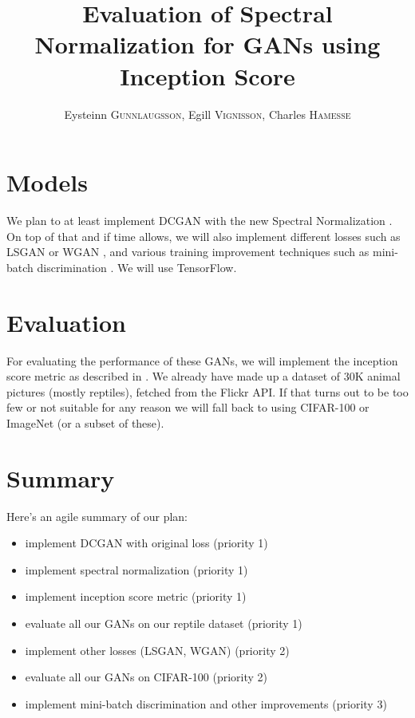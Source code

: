 \documentclass[a4paper]{article}
\title{Evaluation of Spectral Normalization for GANs using Inception Score}
\author{
	Eysteinn \textsc{Gunnlaugsson},
	Egill \textsc{Vignisson},
	Charles \textsc{Hamesse}
}
\begin{document}
\maketitle

 
 
\section{Models} 
We plan to at least implement DCGAN \cite{DBLP:journals/corr/RadfordMC15} with the new Spectral Normalization \cite{miyato2018spectral}. On top of that and if time allows, we will also implement different losses such as LSGAN \cite{mao2017least} or WGAN \cite{arjovsky2017wasserstein}, and various training improvement techniques such as mini-batch discrimination \cite{salimans2016improved}. We will use TensorFlow.

\section{Evaluation} 
For evaluating the performance of these GANs, we will implement the inception score metric as described in \cite{salimans2016improved}. We already have made up a dataset of 30K animal pictures (mostly reptiles), fetched from the Flickr API. If that turns out to be too few or not suitable for any reason we will fall back to using CIFAR-100 or ImageNet (or a subset of these).  

\section{Summary}
Here's an agile summary of our plan: 
\begin{itemize}
	\item implement DCGAN with original loss (priority 1)
	\item implement spectral normalization (priority 1)
	\item implement inception score metric (priority 1)
	\item evaluate all our GANs on our reptile dataset (priority 1)
	\item implement other losses (LSGAN, WGAN) (priority 2)
	\item evaluate all our GANs on CIFAR-100 (priority 2)
	\item implement mini-batch discrimination and other improvements (priority 3)
\end{itemize}


\end{document}
